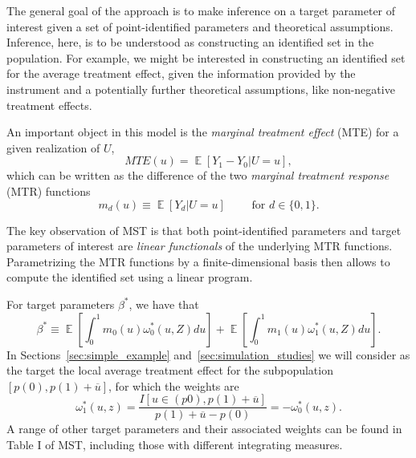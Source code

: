 \documentclass[12pt,a4paper,english]{article} %
\DeclareMathOperator*{\E}{\mathbb{E}}
\numberwithin{equation}{section}
\theoremstyle{definition}
\theoremstyle{remark}
\theoremstyle{plain}
\begin{document}
The general goal of the approach is to make inference on a target parameter of interest given a set of point-identified parameters and theoretical assumptions.
Inference, here, is to be understood as constructing an identified set in the population.
For example, we might be interested in constructing an identified set for the average treatment effect, given the information provided by the instrument and a potentially further theoretical assumptions, like non-negative treatment effects.

An important object in this model is the \textit{marginal treatment effect} (MTE) for a given realization of $U$,
\begin{equation}\label{eq:mte}
  MTE(u) = \E[Y_1 - Y_0|U=u],
\end{equation}
which can be written as the difference of the two \textit{marginal treatment response} (MTR) functions
\begin{equation}\label{eq:mtr}
  m_d(u) \equiv \E[Y_d|U=u] \qquad \text{ for } d\in\{0,1\}.
\end{equation}

The key observation of MST is that both point-identified parameters and target parameters of interest are \textit{linear functionals} of the underlying MTR functions.
Parametrizing the MTR functions by a finite-dimensional basis then allows to compute the identified set using a linear program.

For target parameters $\beta^*$, we have that
\begin{equation}\label{eq:target}
  \beta^* \equiv \E\left[\int_0^1m_0(u)\omega^*_0(u,Z)du\right] + \E\left[\int_0^1m_1(u)\omega^*_1(u,Z)du\right].
\end{equation}
In Sections~\ref{sec:simple_example} and~\ref{sec:simulation_studies} we will consider as the target the local average treatment effect for the subpopulation $[p(0), p(1) + \overline{u}]$, for which the weights are
\begin{equation*}
  \omega^*_1(u, z) = \frac{I[u\in(p0), p(1) + \overline{u}]}{p(1) + \overline{u} - p(0)} = -\omega^*_0(u,z).
\end{equation*}
A range of other target parameters and their associated weights can be found in Table I of MST, including those with different integrating measures.
\end{document}
